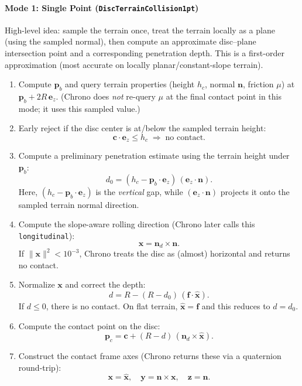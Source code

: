 \paragraph{Mode 1: Single Point (\texttt{DiscTerrainCollision1pt})}
High-level idea: sample the terrain once, treat the terrain locally as a plane (using the sampled normal), then compute
an approximate disc--plane intersection point and a corresponding penetration depth.
This is a first-order approximation (most accurate on locally planar/constant-slope terrain).

\begin{enumerate}
  \item Compute \(\mathbf{p}_b\) and query terrain properties (height \(h_c\), normal \(\mathbf{n}\), friction \(\mu\)) at
    \(\mathbf{p}_b + 2R\,\mathbf{e}_z\).
    (Chrono does \emph{not} re-query \(\mu\) at the final contact point in this mode; it uses this sampled value.)
  \item Early reject if the disc center is at/below the sampled terrain height:
    \[
      \mathbf{c}\cdot\mathbf{e}_z \le h_c \;\Rightarrow\; \text{no contact}.
    \]
  \item Compute a preliminary penetration estimate using the terrain height under \(\mathbf{p}_b\):
    \[
      d_0 = (h_c - \mathbf{p}_b\cdot\mathbf{e}_z)\,(\mathbf{e}_z\cdot\mathbf{n}).
    \]
    Here, \((h_c - \mathbf{p}_b\!\cdot\!\mathbf{e}_z)\) is the \emph{vertical} gap, while \((\mathbf{e}_z\!\cdot\!\mathbf{n})\) projects it
    onto the sampled terrain normal direction.
  \item Compute the slope-aware rolling direction (Chrono later calls this \texttt{longitudinal}):
    \[
      \mathbf{x} = \mathbf{n}_d \times \mathbf{n}.
    \]
    If \(\lVert \mathbf{x}\rVert^2 < 10^{-3}\), Chrono treats the disc as (almost) horizontal and returns no contact.
  \item Normalize \(\mathbf{x}\) and correct the depth:
    \[
      d = R - (R - d_0)\,(\mathbf{f}\cdot \hat{\mathbf{x}}).
    \]
    If \(d \le 0\), there is no contact.
    On flat terrain, \(\hat{\mathbf{x}}=\mathbf{f}\) and this reduces to \(d=d_0\).
  \item Compute the contact point on the disc:
    \[
      \mathbf{p}_c = \mathbf{c} + (R-d)\,(\mathbf{n}_d \times \hat{\mathbf{x}}).
    \]
  \item Construct the contact frame axes (Chrono returns these via a quaternion round-trip):
    \[
      \mathbf{x}=\hat{\mathbf{x}},\quad
      \mathbf{y} = \mathbf{n} \times \mathbf{x},\quad
      \mathbf{z} = \mathbf{n}.
    \]
\end{enumerate}

